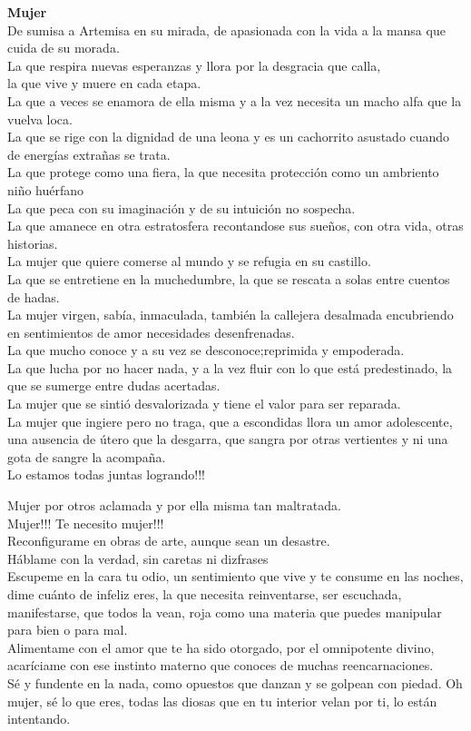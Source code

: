 \documentclass[12pt, a4paper, twoside]{book} %
\begin{document}
\noindent\textbf{Mujer}\\
De sumisa a Artemisa en su mirada, de apasionada con la vida a la mansa que cuida de su morada.\\
La que respira nuevas esperanzas y llora por la desgracia que calla,\\
la que vive y muere en cada etapa.\\
La que a veces se enamora de ella misma y a la vez necesita un macho alfa que la vuelva loca.\\
La que se rige con la dignidad de una leona y es un cachorrito asustado cuando de energías extrañas se trata.\\
La que protege como una fiera, la que necesita protección como un ambriento niño huérfano\\
La que peca con su imaginación y de su intuición no sospecha.\\
La que amanece en otra estratosfera recontandose sus sueños, con otra vida, otras historias.\\
La mujer que quiere comerse al mundo y se refugia en su castillo.\\
La que se entretiene en la muchedumbre, la que se rescata a solas entre cuentos de hadas.\\
La mujer virgen, sabía, inmaculada, también la callejera desalmada encubriendo en sentimientos de amor necesidades desenfrenadas.\\
La que mucho conoce y a su vez se desconoce;reprimida y empoderada.\\
La que lucha por no hacer nada, y a la vez fluir con lo que está predestinado, la que se sumerge entre dudas acertadas.\\
La mujer que se sintió desvalorizada y tiene el valor para ser reparada.\\
La mujer que ingiere pero no traga, que a escondidas llora un amor adolescente, una ausencia de útero que la desgarra, que sangra por otras vertientes y ni una gota de sangre la acompaña.\\
Lo estamos todas juntas logrando!!!

\clearpage

\noindent Mujer por otros aclamada y por ella misma tan maltratada.\\
Mujer!!! Te necesito mujer!!!\\
Reconfigurame en obras de arte, aunque sean un desastre.\\
Háblame con la verdad, sin caretas ni dizfrases\\
Escupeme en la cara tu odio, un sentimiento que vive y te consume en las noches, dime cuánto de infeliz eres, la que necesita reinventarse, ser escuchada, manifestarse, que todos la vean, roja como una materia que puedes manipular para bien o para mal.\\
Alimentame con el amor que te ha sido otorgado, por el omnipotente divino, acaríciame con ese instinto materno que conoces de muchas reencarnaciones.\\
Sé y fundente en la nada, como opuestos que danzan y se golpean con piedad.
Oh mujer, sé lo que eres, todas las diosas que en tu interior velan por ti, lo están intentando.
\end{document}
